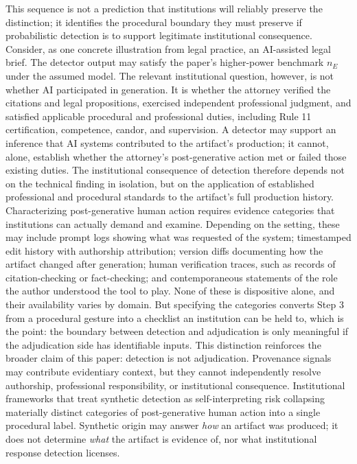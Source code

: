 \documentclass[11pt]{article}
\begin{document}
This sequence is not a prediction that institutions will reliably preserve the
distinction; it identifies the procedural boundary they must preserve if
probabilistic detection is to support legitimate institutional consequence.
Consider, as one concrete illustration from legal practice, an AI-assisted legal
brief. The detector output may satisfy the paper's higher-power benchmark $n_E$ under
the assumed model. The relevant institutional question, however, is not whether AI
participated in generation. It is whether the attorney verified the citations and
legal propositions, exercised independent professional judgment, and satisfied
applicable procedural and professional duties, including Rule 11 certification,
competence, candor, and supervision. A detector may support an inference that AI
systems contributed to the artifact's production; it cannot, alone, establish whether
the attorney's post-generative action met or failed those existing duties. The
institutional consequence of detection therefore depends not on the technical finding
in isolation, but on the application of established professional and procedural
standards to the artifact's full production history.
Characterizing post-generative human action requires evidence categories that
institutions can actually demand and examine. Depending on the setting, these may
include prompt logs showing what was requested of the system; timestamped edit
history with authorship attribution; version diffs documenting how the artifact
changed after generation; human verification traces, such as records of
citation-checking or fact-checking; and contemporaneous statements of the role the
author understood the tool to play. None of these is dispositive alone, and their
availability varies by domain. But specifying the categories converts Step 3 from a
procedural gesture into a checklist an institution can be held to, which is the
point: the boundary between detection and adjudication is only meaningful if the
adjudication side has identifiable inputs.
This distinction reinforces the broader claim of this paper: detection is not
adjudication. Provenance signals may contribute evidentiary context, but they cannot
independently resolve authorship, professional responsibility, or institutional
consequence. Institutional frameworks that treat synthetic detection as
self-interpreting risk collapsing materially distinct categories of post-generative
human action into a single procedural label.
Synthetic origin may answer \emph{how} an artifact was produced; it does not
determine \emph{what} the artifact is evidence of, nor what institutional response
detection licenses.
\end{document}

